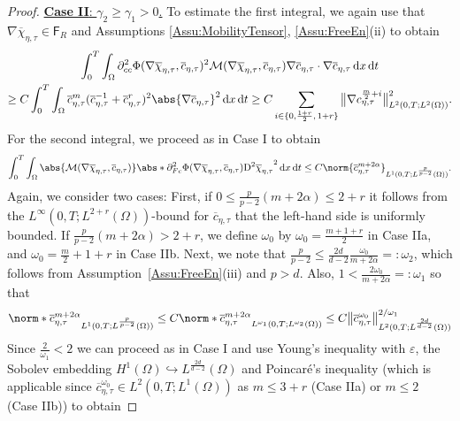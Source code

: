 \documentclass[a4paper,12pt]{article}
\newcommand{\calM}{\mathcal{M}}
\newcommand{\eps}{\varepsilon}
\newcommand{\pl}{\partial}
\newcommand{\dx}{\mathrm{\,d}x}
\newcommand{\dt}{\mathrm{\,d}t}
\newcommand{\chibar}{\overline{\chi}}
\newcommand{\cbar}{\overline{c}}
\newcommand{\rmD}{\mathrm{D}}
\theoremstyle{plain}
\theoremstyle{definition}
\numberwithin{equation}{section}
\begin{document}
\begin{proof}
\underline{\textbf{Case II}: $\gamma_2\geq \gamma_1>0$.} To estimate the first integral, we again use that $\nabla\chibar_{\eta,\tau} \in \mathsf{F}_R$ and Assumptions \ref{Assu:MobilityTensor}, \ref{Assu:FreeEn}(ii) to obtain
\begin{multline}
    \int_0^T\int_\Omega \pl^2_{cc}\Phi(\nabla\chibar_{\eta,\tau},\cbar_{\eta,\tau})^2\calM(\nabla\chibar_{\eta,\tau},\cbar_{\eta,\tau}) \nabla \cbar_{\eta,\tau}\cdot \nabla \cbar_{\eta,\tau} \dx\dt 
    \\\geq C\int_0^T\int_\Omega \cbar_{\eta,\tau}^{m} (\cbar_{\eta,\tau}^{-1} +  \cbar_{\eta,\tau}^r)^2 \abs{\nabla \cbar_{\eta,\tau}}^2\dx\dt\geq C\sum_{i\in \{0,\frac{1+r}{2},\, 1+r\}} \big\|{\nabla c^{\frac{m}{2}+i}_{\eta,\tau}}\big\|^2_{L^2(0,T;L^2(\Omega))}.
    \label{Eqn:FiniteStrain:Interm2:CaseII}
\end{multline}
For the second integral, we proceed as in Case I to obtain
\begin{align*}
\int_0^T\int_\Omega \abs{\calM(\nabla\chibar_{\eta,\tau},\cbar_{\eta,\tau})}
\abs*{\pl^2_{Fc}\Phi(\nabla\chibar_{\eta,\tau},\cbar_{\eta,\tau})\rmD^2\chibar_{\eta,\tau}}^2 \dx\dt 
\leq C\norm{\cbar^{m+2\alpha}_{\eta,\tau}}_{L^1(0,T;L^\frac{p}{p-2}(\Omega))}.
\end{align*}
Again, we consider two cases: First, if $0\leq \frac{p}{p-2}(m+2\alpha)\leq 2+r$ it follows from the $L^\infty(0,T;L^{2+r}(\Omega))$-bound for $\cbar_{\eta,\tau}$ that the left-hand side is uniformly bounded. If $\frac{p}{p-2}(m+2\alpha)>2+r$, we define $\omega_0$ by $\omega_0 = \frac{m+1+r}{2}$ in Case IIa, and $\omega_0 = \frac{m}{2}{+}1{+}r$ in Case IIb. Next, we note that $\frac{p}{p-2}\leq \frac{2d}{d-2}\frac{\omega_0}{m+2\alpha} =: \omega_2$, which follows from Assumption~\ref{Assu:FreeEn}(iii) and $p>d$. Also, $1< \frac{2\omega_0}{m+2\alpha} =: \omega_1$ so that
 \begin{align*}
        \norm*{\cbar^{m+2\alpha}_{\eta,\tau}}_{L^1(0,T;L^\frac{p}{p-2}(\Omega))} 
	    \leq C\norm*{\cbar_{\eta,\tau}^{m+2\alpha}}_{L^{\omega_1}(0,T;L^{\omega_2}(\Omega))}
        \leq C\big\|{\cbar_{\eta,\tau}^{\omega_0}}\big\|_{L^2(0,T;L^{\frac{2d}{d-2}}(\Omega))}^{2/\omega_1}
	\end{align*}
Since $\frac{2}{\omega_1}< 2$ we can proceed as in Case I and use Young's inequality with $\eps$, the Sobolev embedding $H^1(\Omega)\hookrightarrow L^{\frac{2d}{d-2}}(\Omega)$ and Poincar\'e's inequality (which is applicable since $\cbar_{\eta,\tau}^{\omega_0}\in L^2(0,T;L^1(\Omega))$ as $m\leq 3+r$ (Case IIa) or $m\leq 2$ (Case IIb)) to obtain

\end{proof}
\end{document}

